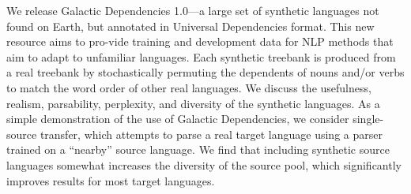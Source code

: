 We release Galactic Dependencies 1.0—a large set of synthetic languages not found on Earth, but annotated in Universal Dependencies format. This new resource aims to pro-vide training and development data for NLP methods that aim to adapt to unfamiliar languages. Each synthetic treebank is produced from a real treebank by stochastically permuting the dependents of nouns and/or verbs to match the word order of other real languages. We discuss the usefulness, realism, parsability, perplexity, and diversity of the synthetic languages. As a simple demonstration of the use of Galactic Dependencies, we consider single-source transfer, which attempts to parse a real target language using a parser trained on a ``nearby'' source language. We find that including synthetic source languages somewhat increases the diversity of the source pool, which significantly improves results for most target languages.
